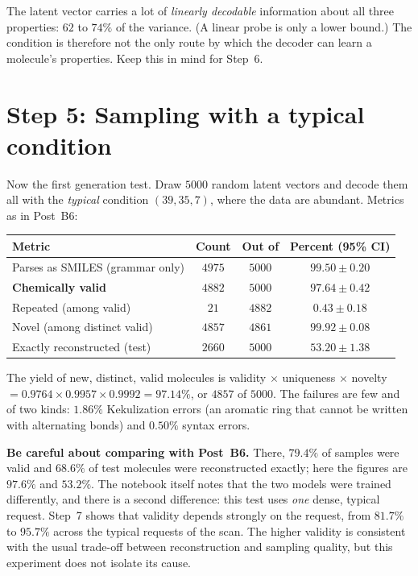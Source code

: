 \documentclass[11pt]{article}
\begin{document}
The latent vector carries a lot of \emph{linearly decodable} information about all three properties: $62$ to $74\%$ of the variance. (A linear probe is only a lower bound.) The condition is therefore not the only route by which the decoder can learn a molecule's properties. Keep this in mind for Step~6.

\section{Step 5: Sampling with a typical condition}
Now the first generation test. Draw $5000$ random latent vectors and decode them all with the \emph{typical} condition $(39,35,7)$, where the data are abundant. Metrics as in Post~B6:

\begin{center}
\small
\begin{tabular}{@{}lccc@{}}
\toprule
Metric & Count & Out of & Percent (95\% CI)\\
\midrule
Parses as SMILES (grammar only) & $4975$ & $5000$ & $99.50\pm0.20$\\
\textbf{Chemically valid} & $4882$ & $5000$ & $\mathbf{97.64}\pm0.42$\\
Repeated (among valid) & $21$ & $4882$ & $0.43\pm0.18$\\
Novel (among distinct valid) & $4857$ & $4861$ & $99.92\pm0.08$\\
Exactly reconstructed (test) & $2660$ & $5000$ & $53.20\pm1.38$\\
\bottomrule
\end{tabular}
\end{center}

The yield of new, distinct, valid molecules is validity $\times$ uniqueness $\times$ novelty $=0.9764\times0.9957\times0.9992=97.14\%$, or $4857$ of $5000$. The failures are few and of two kinds: $1.86\%$ Kekulization errors (an aromatic ring that cannot be written with alternating bonds) and $0.50\%$ syntax errors.

\textbf{Be careful about comparing with Post~B6.} There, $79.4\%$ of samples were valid and $68.6\%$ of test molecules were reconstructed exactly; here the figures are $97.6\%$ and $53.2\%$. The notebook itself notes that the two models were trained differently, and there is a second difference: this test uses \emph{one} dense, typical request. Step~7 shows that validity depends strongly on the request, from $81.7\%$ to $95.7\%$ across the typical requests of the scan. The higher validity is consistent with the usual trade-off between reconstruction and sampling quality, but this experiment does not isolate its cause.
\end{document}
